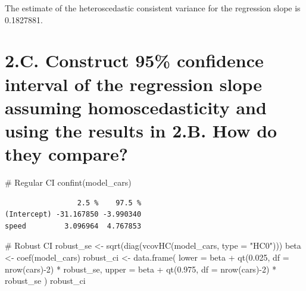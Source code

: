 \documentclass[
  letterpaper,
  DIV=11,
  numbers=noendperiod]{scrartcl}
\newenvironment{Shaded}{\begin{snugshade}}{\end{snugshade}}
\newcommand{\AttributeTok}[1]{\textcolor[rgb]{0.40,0.45,0.13}{#1}}
\newcommand{\CommentTok}[1]{\textcolor[rgb]{0.37,0.37,0.37}{#1}}
\newcommand{\DecValTok}[1]{\textcolor[rgb]{0.68,0.00,0.00}{#1}}
\newcommand{\FloatTok}[1]{\textcolor[rgb]{0.68,0.00,0.00}{#1}}
\newcommand{\FunctionTok}[1]{\textcolor[rgb]{0.28,0.35,0.67}{#1}}
\newcommand{\NormalTok}[1]{\textcolor[rgb]{0.00,0.23,0.31}{#1}}
\newcommand{\OtherTok}[1]{\textcolor[rgb]{0.00,0.23,0.31}{#1}}
\newcommand{\SpecialCharTok}[1]{\textcolor[rgb]{0.37,0.37,0.37}{#1}}
\newcommand{\StringTok}[1]{\textcolor[rgb]{0.13,0.47,0.30}{#1}}
\begin{document}
The estimate of the heteroscedastic consistent variance for the
regression slope is 0.1827881.

\hypertarget{c.-construct-95-confidence-interval-of-the-regression-slope-assuming-homoscedasticity-and-using-the-results-in-2.b.-how-do-they-compare}{%
\section{2.C. Construct 95\% confidence interval of the regression slope
assuming homoscedasticity and using the results in 2.B. How do they
compare?}\label{c.-construct-95-confidence-interval-of-the-regression-slope-assuming-homoscedasticity-and-using-the-results-in-2.b.-how-do-they-compare}}

\begin{Shaded}
\begin{Highlighting}[]
\CommentTok{\# Regular CI}
\FunctionTok{confint}\NormalTok{(model\_cars)}
\end{Highlighting}
\end{Shaded}

\begin{verbatim}
                 2.5 %    97.5 %
(Intercept) -31.167850 -3.990340
speed         3.096964  4.767853
\end{verbatim}

\begin{Shaded}
\begin{Highlighting}[]
\CommentTok{\# Robust CI}
\NormalTok{robust\_se }\OtherTok{\textless{}{-}} \FunctionTok{sqrt}\NormalTok{(}\FunctionTok{diag}\NormalTok{(}\FunctionTok{vcovHC}\NormalTok{(model\_cars, }\AttributeTok{type =} \StringTok{"HC0"}\NormalTok{)))}
\NormalTok{beta }\OtherTok{\textless{}{-}} \FunctionTok{coef}\NormalTok{(model\_cars)}
\NormalTok{robust\_ci }\OtherTok{\textless{}{-}} \FunctionTok{data.frame}\NormalTok{(}
  \AttributeTok{lower =}\NormalTok{ beta }\SpecialCharTok{+} \FunctionTok{qt}\NormalTok{(}\FloatTok{0.025}\NormalTok{, }\AttributeTok{df =} \FunctionTok{nrow}\NormalTok{(cars)}\SpecialCharTok{{-}}\DecValTok{2}\NormalTok{) }\SpecialCharTok{*}\NormalTok{ robust\_se,}
  \AttributeTok{upper =}\NormalTok{ beta }\SpecialCharTok{+} \FunctionTok{qt}\NormalTok{(}\FloatTok{0.975}\NormalTok{, }\AttributeTok{df =} \FunctionTok{nrow}\NormalTok{(cars)}\SpecialCharTok{{-}}\DecValTok{2}\NormalTok{) }\SpecialCharTok{*}\NormalTok{ robust\_se}
\NormalTok{)}
\NormalTok{robust\_ci}
\end{Highlighting}
\end{Shaded}
\end{document}
